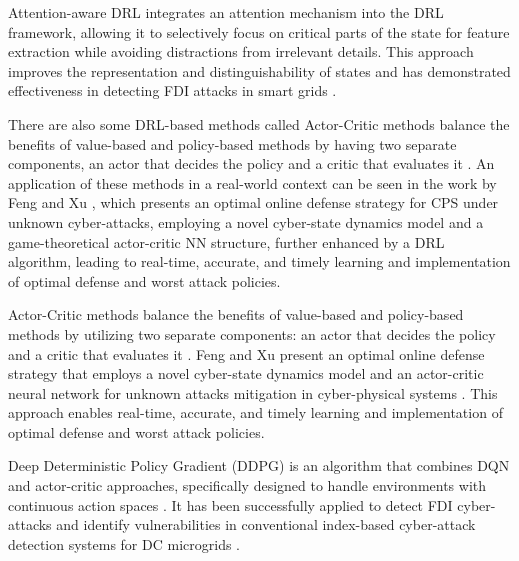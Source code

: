 \documentclass[10pt, journal]{IEEEtran}
\begin{document}
Attention-aware DRL integrates an attention mechanism into the DRL framework, allowing it to selectively focus on critical parts of the state for feature extraction while avoiding distractions from irrelevant details. This approach improves the representation and distinguishability of states and has demonstrated effectiveness in detecting FDI attacks in smart grids \cite{huang2023attention}.

There are also some DRL-based methods called Actor-Critic methods balance the benefits of value-based and policy-based methods by having two separate components, an actor that decides the policy and a critic that evaluates it \cite{konda1999actor}. An application of these methods in a real-world context can be seen in the work by Feng and Xu \cite{feng2017deep}, which presents an optimal online defense strategy for CPS under unknown cyber-attacks, employing a novel cyber-state dynamics model and a game-theoretical actor-critic NN structure, further enhanced by a DRL algorithm, leading to real-time, accurate, and timely learning and implementation of optimal defense and worst attack policies. 

Actor-Critic methods balance the benefits of value-based and policy-based methods by utilizing two separate components: an actor that decides the policy and a critic that evaluates it \cite{konda1999actor}. Feng and Xu present an optimal online defense strategy that employs a novel cyber-state dynamics model and an actor-critic neural network for unknown attacks mitigation in cyber-physical systems \cite{feng2017deep}. This approach enables real-time, accurate, and timely learning and implementation of optimal defense and worst attack policies.

Deep Deterministic Policy Gradient (DDPG) is an algorithm that combines DQN and actor-critic approaches, specifically designed to handle environments with continuous action spaces \cite{lillicrap2015continuous}. It has been successfully applied to detect FDI cyber-attacks and identify vulnerabilities in conventional index-based cyber-attack detection systems for DC microgrids \cite{abianeh2021vulnerability}.
\end{document}
